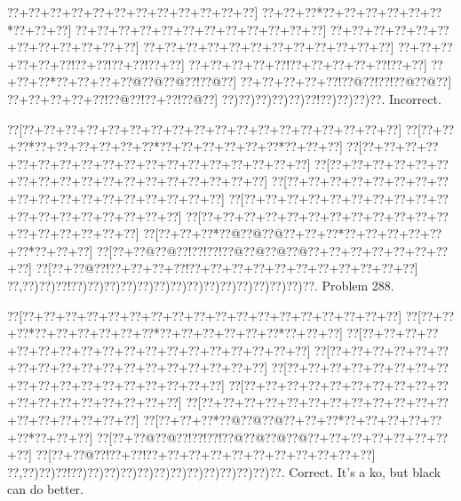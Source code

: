 \documentclass[a5paper]{article}
\begin{document}
\begin{center}
{\goo
\0??+\0??+\0??+\0??+\0??+\0??+\0??+\0??+\0??+\0??+\0??+\0??]
\0??+\0??+\0??*\0??+\0??+\0??+\0??+\0??+\0??*\0??+\0??+\0??]
\0??+\0??+\0??+\0??+\0??+\0??+\0??+\0??+\0??+\0??+\0??+\0??]
\0??+\0??+\0??+\0??+\0??+\0??+\0??+\0??+\0??+\0??+\0??+\0??]
\0??+\0??+\0??+\0??+\0??+\0??+\0??+\0??+\0??+\0??+\0??+\0??]
\0??+\0??+\0??+\0??+\0??+\0??!\0??+\0??!\0??+\0??!\0??+\0??]
\0??+\0??+\0??+\0??+\0??!\0??+\0??+\0??+\0??+\0??!\0??+\0??]
\0??+\0??+\0??*\0??+\0??+\0??+\0??@\0??@\0??@\0??!\0??@\0??]
\0??+\0??+\0??+\0??+\0??!\0??@\0??!\0??!\0??@\0??@\0??]
\0??+\0??+\0??+\0??+\0??!\0??@\0??!\0??+\0??!\0??@\0??]
\0??)\0??)\0??)\0??)\0??)\0??!\0??)\0??)\0??)\0??.
}
Incorrect. 

\end{center}
\newpage
\begin{center}
{\goo
\0??[\0??+\0??+\0??+\0??+\0??+\0??+\0??+\0??+\0??+\0??+\0??+\0??+\0??+\0??+\0??+\0??+\0??+\0??]
\0??[\0??+\0??+\0??*\0??+\0??+\0??+\0??+\0??+\0??*\0??+\0??+\0??+\0??+\0??+\0??*\0??+\0??+\0??]
\0??[\0??+\0??+\0??+\0??+\0??+\0??+\0??+\0??+\0??+\0??+\0??+\0??+\0??+\0??+\0??+\0??+\0??+\0??]
\0??[\0??+\0??+\0??+\0??+\0??+\0??+\0??+\0??+\0??+\0??+\0??+\0??+\0??+\0??+\0??+\0??+\0??+\0??]
\0??[\0??+\0??+\0??+\0??+\0??+\0??+\0??+\0??+\0??+\0??+\0??+\0??+\0??+\0??+\0??+\0??+\0??+\0??]
\0??[\0??+\0??+\0??+\0??+\0??+\0??+\0??+\0??+\0??+\0??+\0??+\0??+\0??+\0??+\0??+\0??+\0??+\0??]
\0??[\0??+\0??+\0??+\0??+\0??+\0??+\0??+\0??+\0??+\0??+\0??+\0??+\0??+\0??+\0??+\0??+\0??+\0??]
\0??[\0??+\0??+\0??*\0??@\0??@\0??@\0??+\0??+\0??*\0??+\0??+\0??+\0??+\0??+\0??*\0??+\0??+\0??]
\0??[\0??+\0??@\0??@\0??!\0??!\0??!\0??@\0??@\0??@\0??@\0??+\0??+\0??+\0??+\0??+\0??+\0??+\0??]
\0??[\0??+\0??@\0??!\0??+\0??+\0??+\0??!\0??+\0??+\0??+\0??+\0??+\0??+\0??+\0??+\0??+\0??+\0??]
\0??,\0??)\0??)\0??!\0??)\0??)\0??)\0??)\0??)\0??)\0??)\0??)\0??)\0??)\0??)\0??)\0??)\0??)\0??.
}
Problem 288.

\end{center}
\begin{center}
{\goo
\0??[\0??+\0??+\0??+\0??+\0??+\0??+\0??+\0??+\0??+\0??+\0??+\0??+\0??+\0??+\0??+\0??+\0??+\0??]
\0??[\0??+\0??+\0??*\0??+\0??+\0??+\0??+\0??+\0??*\0??+\0??+\0??+\0??+\0??+\0??*\0??+\0??+\0??]
\0??[\0??+\0??+\0??+\0??+\0??+\0??+\0??+\0??+\0??+\0??+\0??+\0??+\0??+\0??+\0??+\0??+\0??+\0??]
\0??[\0??+\0??+\0??+\0??+\0??+\0??+\0??+\0??+\0??+\0??+\0??+\0??+\0??+\0??+\0??+\0??+\0??+\0??]
\0??[\0??+\0??+\0??+\0??+\0??+\0??+\0??+\0??+\0??+\0??+\0??+\0??+\0??+\0??+\0??+\0??+\0??+\0??]
\0??[\0??+\0??+\0??+\0??+\0??+\0??+\0??+\0??+\0??+\0??+\0??+\0??+\0??+\0??+\0??+\0??+\0??+\0??]
\0??[\0??+\0??+\0??+\0??+\0??+\0??+\0??+\0??+\0??+\0??+\0??+\0??+\0??+\0??+\0??+\0??+\0??+\0??]
\0??[\0??+\0??+\0??*\0??@\0??@\0??@\0??+\0??+\0??*\0??+\0??+\0??+\0??+\0??+\0??*\0??+\0??+\0??]
\0??[\0??+\0??@\0??@\0??!\0??!\0??!\0??@\0??@\0??@\0??@\0??+\0??+\0??+\0??+\0??+\0??+\0??+\0??]
\0??[\0??+\0??@\0??!\0??+\0??!\0??+\0??+\0??+\0??+\0??+\0??+\0??+\0??+\0??+\0??+\0??]
\0??,\0??)\0??)\0??!\0??)\0??)\0??)\0??)\0??)\0??)\0??)\0??)\0??)\0??)\0??)\0??)\0??.
}
Correct. It's a ko, but black can do better.

\end{center}
\end{document}
